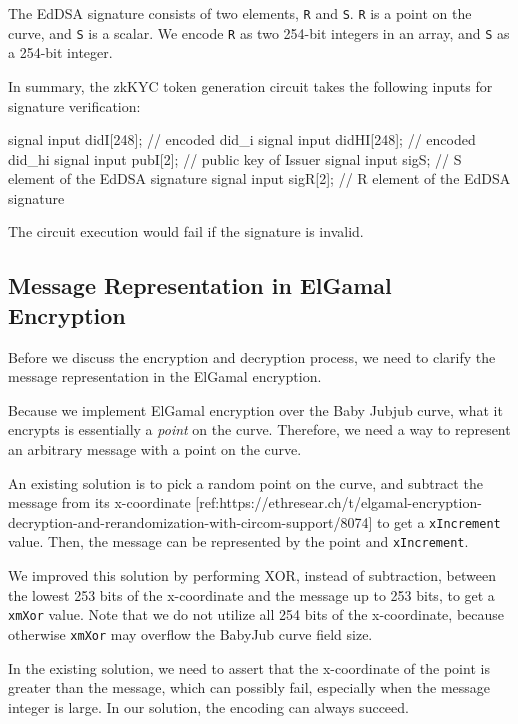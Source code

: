 \documentclass[
]{report}
\newenvironment{Shaded}{}{}
\newcommand{\NormalTok}[1]{#1}
\begin{document}
The EdDSA signature consists of two elements, \texttt{R} and \texttt{S}.
\texttt{R} is a point on the curve, and \texttt{S} is a scalar. We
encode \texttt{R} as two 254-bit integers in an array, and \texttt{S} as
a 254-bit integer.

In summary, the zkKYC token generation circuit takes the following
inputs for signature verification:

\begin{Shaded}
\begin{Highlighting}[]
\NormalTok{signal input didI[248];  // encoded did\_i}
\NormalTok{signal input didHI[248]; // encoded did\_hi}
\NormalTok{signal input pubI[2];    // public key of Issuer}
\NormalTok{signal input sigS;       // S element of the EdDSA signature}
\NormalTok{signal input sigR[2];    // R element of the EdDSA signature}
\end{Highlighting}
\end{Shaded}

The circuit execution would fail if the signature is invalid.

\subsection{Message Representation in ElGamal Encryption}

Before we discuss the encryption and decryption process, we need to
clarify the message representation in the ElGamal encryption.

Because we implement ElGamal encryption over the Baby Jubjub curve, what
it encrypts is essentially a \emph{point} on the curve. Therefore, we
need a way to represent an arbitrary message with a point on the curve.

An existing solution is to pick a random point on the curve, and
subtract the message from its x-coordinate
{[}ref:https://ethresear.ch/t/elgamal-encryption-decryption-and-rerandomization-with-circom-support/8074{]}
to get a \texttt{xIncrement} value. Then, the message can be represented
by the point and \texttt{xIncrement}.

We improved this solution by performing XOR, instead of subtraction,
between the lowest 253 bits of the x-coordinate and the message up to
253 bits, to get a \texttt{xmXor} value. Note that we do not utilize all
254 bits of the x-coordinate, because otherwise \texttt{xmXor} may
overflow the BabyJub curve field size.

In the existing solution, we need to assert that the x-coordinate of the
point is greater than the message, which can possibly fail, especially
when the message integer is large. In our solution, the encoding can
always succeed.
\end{document}
